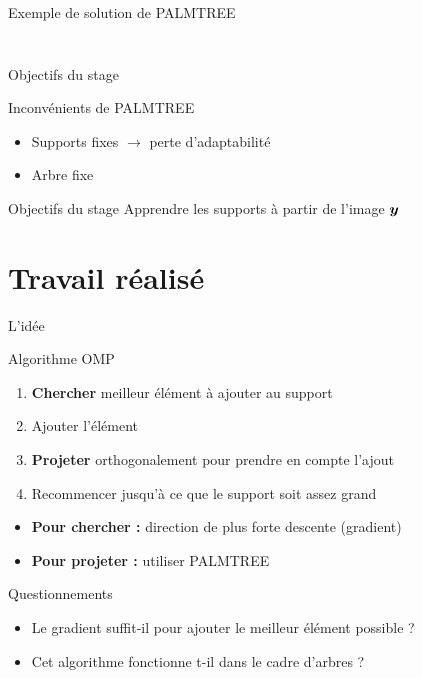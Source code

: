 \begin{frame}{Exemple de solution de PALMTREE}
\begin{columns}
\begin{column}{0.49\textwidth}
\begin{figure}
\end{figure}\end{column}
\end{columns}
\end{frame}


\begin{frame}{Objectifs du stage}
\begin{alertblock}{Inconvénients de PALMTREE}
\begin{itemize}
	\item Supports fixes $\rightarrow$ perte d'adaptabilité
	\item Arbre fixe
\end{itemize}
\end{alertblock}
\begin{exampleblock}{Objectifs du stage}
Apprendre les supports à partir de l'image $\bm{y}$
\end{exampleblock}
\end{frame}


\section{Travail réalisé}

\begin{frame}{L'idée}
\begin{block}{Algorithme OMP}
	\begin{enumerate}
		\item \textbf{Chercher} meilleur élément à ajouter au support
		\item Ajouter l'élément
		\item \textbf{Projeter} orthogonalement pour prendre en compte l'ajout
		\item Recommencer jusqu'à ce que le support soit assez grand
	\end{enumerate}
\end{block}
\begin{itemize}
\item \textbf{Pour chercher :} direction de plus forte descente (gradient)
\item \textbf{Pour projeter :} utiliser PALMTREE
\end{itemize}
\begin{exampleblock}{Questionnements}
\begin{itemize}
	\item Le gradient suffit-il pour ajouter le meilleur élément possible ?
	\item Cet algorithme fonctionne t-il dans le cadre d'arbres ?
\end{itemize}
\end{exampleblock}
\end{frame}


